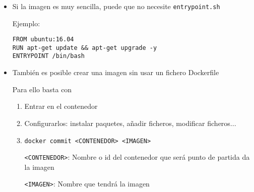 \documentclass[ucs]{beamer}
\begin{document}
\begin{frame}[fragile]
\frametitle{}
\begin{itemize}
\item
Si la imagen es muy sencilla, puede que no necesite 
\verb|entrypoint.sh|

Ejemplo:

  \begin{scriptsize}
  \begin{verbatim}
FROM ubuntu:16.04
RUN apt-get update && apt-get upgrade -y
ENTRYPOINT /bin/bash
  \end{verbatim}
  \end{scriptsize}

\item
También es posible crear una imagen sin usar un fichero Dockerfile

Para ello basta con

    \begin{enumerate}
    \item
Entrar en el contenedor

    \item
Configurarlos: instalar paquetes, añadir ficheros, modificar ficheros...

    \item

\verb|docker commit <CONTENEDOR> <IMAGEN>|

\verb|<CONTENEDOR>|: Nombre o id del contenedor que será punto de partida da la imagen

\verb|<IMAGEN>|: Nombre que tendrá la imagen
    \end{enumerate}
\end{itemize}



\end{frame}
\end{document}
